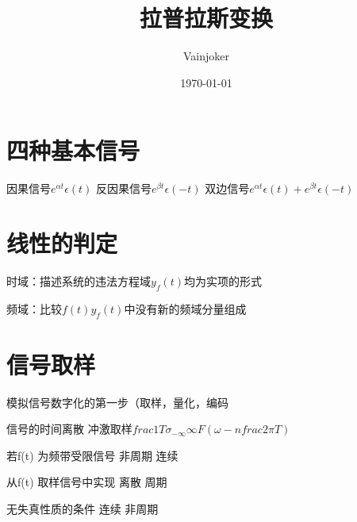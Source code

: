 \documentclass{article}
\title{拉普拉斯变换}
\author{Vainjoker}
\date{\today}
\begin{document}
    \maketitle
    \newpage

    \section{四种基本信号}

    因果信号$e^{\alpha t}\epsilon(t)$
    反因果信号$e^{\beta t}\epsilon(-t)$
    双边信号$e^{\alpha t}\epsilon(t)+e^{\beta t}\epsilon(-t)$
    
    \section{线性的判定}
    时域：描述系统的违法方程域$y_f(t)$均为实项的形式
    
    频域：比较$f(t)y_f(t)$中没有新的频域分量组成

    \section{信号取样}

    模拟信号数字化的第一步（取样，量化，编码

    信号的时间离散
    冲激取样$frac{1}{T}\sigma_{-\infty}{\infty}F(\omega-nfrac{2\pi}{T})$

    若f(t) 为频带受限信号  非周期 连续

    从f(t) 取样信号中实现  离散 周期

    无失真性质的条件  连续 非周期


    
\end{document}
